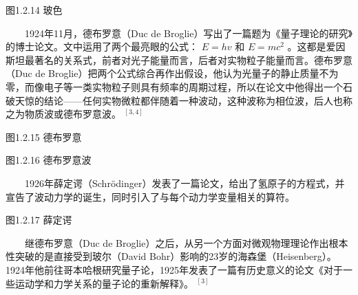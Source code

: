 \documentclass[a4paper,11pt,english]{sphinxmanual}
\begin{document}

\begin{center}图1.2.14 玻色
\end{center}
\sphinxAtStartPar
  1924年11月，德布罗意（Duc de Broglie）写出了一篇题为《量子理论的研究》的博士论文。文中运用了两个最亮眼的公式： \(E=hv\) 和 \(E=m c^{2}\) 。这都是爱因斯坦最著名的关系式，前者对光子能量而言，后者对实物粒子能量而言。德布罗意（Duc de Broglie）把两个公式综合再作出假设，他认为光量子的静止质量不为零，而像电子等一类实物粒子则具有频率的周期过程，所以在论文中他得出一个石破天惊的结论——任何实物微粒都伴随着一种波动，这种波称为相位波，后人也称之为物质波或德布罗意波。 \(^{[3,4]}\)


\begin{center}图1.2.15 德布罗意
\end{center}

\begin{center}图1.2.16 德布罗意波
\end{center}
\sphinxAtStartPar
  1926年薛定谔（Schrödinger）发表了一篇论文，给出了氢原子的方程式，并宣告了波动力学的诞生，同时引入了与每个动力学变量相关的算符。


\begin{center}图1.2.17 薛定谔
\end{center}
\sphinxAtStartPar
  继德布罗意（Duc de Broglie）之后，从另一个方面对微观物理理论作出根本性突破的是直接受到玻尔（David Bohr）影响的23岁的海森堡（Heisenberg）。1924年他前往哥本哈根研究量子论，1925年发表了一篇有历史意义的论文《对于一些运动学和力学关系的量子论的重新解释》。 \(^{[3]}\)

\end{document}
